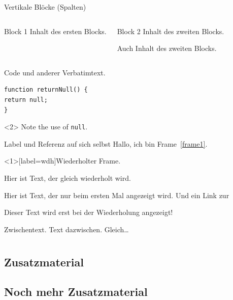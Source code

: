 \documentclass[ngerman]{scrartcl}
\begin{document}
	\begin{frame}{Vertikale Blöcke (Spalten)}
		\begin{columns}
				\begin{block}{Block 1}
					Inhalt des ersten Blocks.
				\end{block}
				\begin{block}{Block 2}
					Inhalt des zweiten Blocks.

					Auch Inhalt des zweiten Blocks.
				\end{block}
		\end{columns}
	\end{frame}

\begin{frame}[fragile]{Code und anderer Verbatimtext.}
\begin{verbatim}
function returnNull() {
return null;
}
\end{verbatim}
\begin{uncoverenv}<2>
Note the use of \verb|null|.
\end{uncoverenv}
\end{frame}

	\begin{frame}[label=frame1]{Label und Referenz auf sich selbst}
		Hallo, ich bin Frame~\autoref{frame1}.
	\end{frame}

	\begin{frame}[label=wdh]{Wiederholter Frame.}

		Hier ist Text, der gleich wiederholt wird.

		\begin{overprint}
			Hier ist Text, der nur beim ersten Mal angezeigt wird.
			Und ein Link zur \hyperlink{wdh<2>}{}

			Dieser Text wird erst bei der Wiederholung angezeigt!
		\end{overprint}
	\end{frame}

	\begin{frame}{Zwischentext.}
		Text dazwischen. Gleich\dots
	\end{frame}









	\appendix

	\section{\appendixname}

	\frame{\tableofcontents}

	\subsection{Zusatzmaterial}


	\subsection{Noch mehr Zusatzmaterial}

\end{document}
